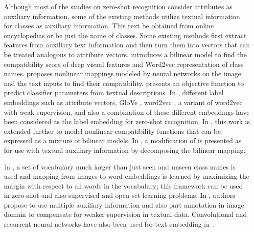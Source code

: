 \documentclass[10pt,twocolumn,letterpaper]{article}
\begin{document}
 Although most of the studies on zero-shot recognition consider attributes as auxiliary information, some of the existing methods utilize textual
  information for classes as auxiliary information.
  This text be obtained from online encyclopedias or be just the name of classes.
   Some existing methods first extract features from auxiliary text information and then turn them into vectors that can be treated analogous to attribute vectors.
 \cite{devise} introduces a bilinear model to find the compatibility score of deep visual features and Word2vec \cite{word2vec} representation of class names. \cite{ba2015} proposes nonlinear mappings modeled by neural networks on the image and the text inputs to find their compatibility.
  \cite{mohamed13} presents an objective function to predict classifier parameters from textual descriptions. In \cite{Akata2015}, different label embeddings such as attribute vectors, GloVe \cite{pennington2014glove}, word2vec \cite{word2vec}, a variant of word2vec with weak supervision, and also a combination of these different embeddings have been considered as the label embedding for zero-shot recognition. In \cite{Xian2016}, this work is extended further to model nonlinear compatibility
   functions that can be expressed as a mixture of bilinear models.
  In \cite{Qiao2016}, a modification of \cite{emb15} is presented as for use with textual auxiliary information by decomposing the bilinear mapping.

In \cite{Fu2016}, a set of vocabulary much larger than just seen and unseen class names is used and mapping from images to word embeddings is learned
by  maximizing the margin with respect to all words in the vocabulary; this framework can be used in zero-shot and also supervised and open set learning problems.
In  \cite{Akata2016}, authors propose to use multiple auxiliary information and also  part annotation in image domain to compensate for weaker supervision in textual data.
Convolutional and recurrent neural networks  have also been used for text embedding in \cite{Akata2016rnn}.
\end{document}
